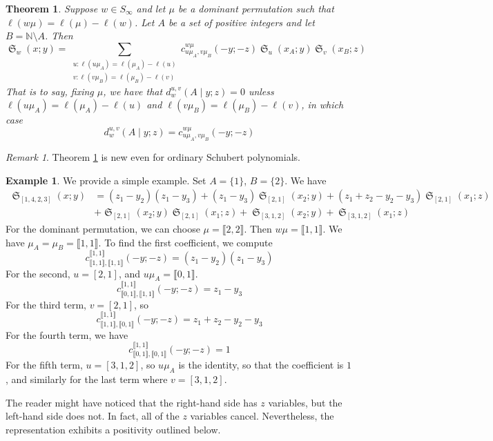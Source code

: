 \documentclass{amsart}
\newtheorem{theorem}{Theorem}[section]
\theoremstyle{definition}
\newtheorem{example}[lemma]{Example}
\theoremstyle{remark}
\newtheorem*{remark}{Remark}
\numberwithin{equation}{subsection}
\DeclareMathOperator{\sch}{\mathfrak{S}}
\newcommand{\cperm}[1]{\llbracket #1\rrbracket}
\newcommand{\cpcf}[5]{d^{#1,#2}_{#3}\left(#4\mid #5\right)}
\begin{document}
\begin{theorem} \label{theorem:doublecoprodpos}
Suppose $w\in S_\infty$ and let $\mu$ be a dominant permutation such that $\ell(w\mu)=\ell(\mu)-\ell(w)$. Let $A$ be a set of positive integers and let $B=\mathbb{N}\setminus A$. Then
$$\sch_w(x;y)=\sum_{\substack{u:\ell(u\mu_A)=\ell(\mu_A)-\ell(u)\\v:\ell(v\mu_B)=\ell(\mu_B)-\ell(v)}}c_{u\mu_A,v\mu_B}^{w\mu}(-y;-z)\sch_u(x_A;y)\sch_v(x_B;z)$$
That is to say, fixing $\mu$, we have that $\cpcf{u}{v}{w}{A}{y;z}=0$ unless $\ell(u\mu_A)=\ell(\mu_A)-\ell(u)$ and $\ell(v\mu_B)=\ell(\mu_B)-\ell(v)$, in which case
$$\cpcf{u}{v}{w}{A}{y;z}=c_{u\mu_A,v\mu_B}^{w\mu}(-y;-z)$$
\end{theorem}

\begin{remark}
	Theorem \ref{theorem:doublecoprodpos} is new even for ordinary Schubert polynomials.
\end{remark}

\begin{example} 
	We provide a simple example. Set $A=\{1\}$, $B=\{2\}$. We have
	\begin{align*}
	\sch_{[1,4,2,3]}(x;y) &= (z_1-y_2)(z_1-y_3)+(z_1-y_3)\sch_{[2,1]}(x_2;y)+(z_1+z_2-y_2-y_3)\sch_{[2,1]}(x_1;z)\\
	&+\sch_{[2,1]}(x_2;y)\sch_{[2,1]}(x_1;z)+\sch_{[3,1,2]}(x_2;y)+\sch_{[3,1,2]}(x_1;z)
	\end{align*}
	For the dominant permutation, we can choose $\mu=\cperm{2,2}$. Then $w\mu = \cperm{1,1}$. We have $\mu_A=\mu_B=\cperm{1,1}$. To find the first coefficient, we compute
	$$c_{\cperm{1,1},\cperm{1,1}}^{\cperm{1,1}}(-y;-z)=(z_1-y_2)(z_1-y_3)$$
	For the second, $u=[2,1]$, and $u\mu_A=\cperm{0,1}$.
	$$c_{\cperm{0,1},\cperm{1,1}}^{\cperm{1,1}}(-y;-z)=z_1-y_3$$
	For the third term, $v=[2,1]$, so
	$$c_{\cperm{1,1},\cperm{0,1}}^{\cperm{1,1}}(-y;-z)=z_1+z_2-y_2-y_3$$
	 For the fourth term, we have
	$$c_{\cperm{0,1},\cperm{0,1}}^{\cperm{1,1}}(-y;-z)=1$$
	For the fifth term, $u=[3,1,2]$, so $u\mu_A$ is the identity, so that the coefficient is $1$, and similarly for the last term where $v=[3,1,2]$.
	
	The reader might have noticed that the right-hand side has $z$ variables, but the left-hand side does not. In fact, all of the $z$ variables cancel. Nevertheless, the representation exhibits a positivity outlined below.
\end{example}
\end{document}
